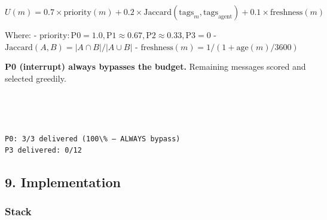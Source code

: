 \documentclass[11pt]{article}
\begin{document}
\[U(m) = 0.7 \times \text{priority}(m) + 0.2 \times \text{Jaccard}(\text{tags}_m, \text{tags}_{\text{agent}}) + 0.1 \times \text{freshness}(m)\]

Where: -
\(\text{priority}: \text{P0}=1.0, \text{P1}\approx0.67, \text{P2}\approx0.33, \text{P3}=0\)
- \(\text{Jaccard}(A, B) = |A \cap B| / |A \cup B|\) -
\(\text{freshness}(m) = 1 / (1 + \text{age}(m) / 3600)\)

\textbf{P0 (interrupt) always bypasses the budget.} Remaining messages
scored and selected greedily.

    \begin{center}
    \end{center}
    { \hspace*{\fill} \\}
    
    \begin{center}
    \end{center}
    { \hspace*{\fill} \\}
    
    \begin{Verbatim}[commandchars=\\\{\}]
P0: 3/3 delivered (100\% — ALWAYS bypass)
P3 delivered: 0/12
    \end{Verbatim}

    \subsection{9. Implementation}\label{implementation}

\subsubsection{Stack}\label{stack}
\end{document}
